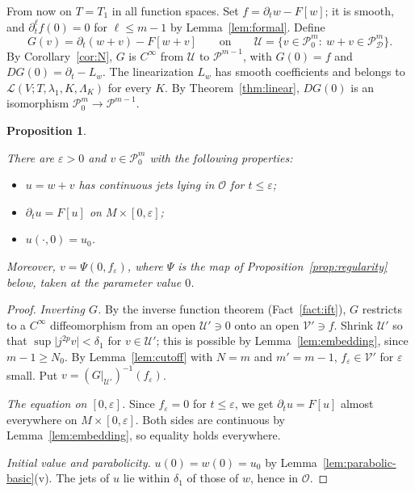 \documentclass[11pt,reqno]{amsart}
\newtheorem{proposition}[theorem]{Proposition}
\theoremstyle{definition}
\theoremstyle{remark}
\newcommand{\Pp}{\mathcal{P}}
\newcommand{\Dom}{\mathcal{D}}
\newcommand{\Par}{\mathcal{O}}
\newcommand{\Lcl}{\mathcal{L}}
\newcommand{\abs}[1]{\lvert #1\rvert}
\newcommand{\lean}[1]{}
\newcommand{\uses}[1]{}
\numberwithin{equation}{section}
\begin{document}
From now on $T=T_1$ in all function spaces. Set $f=\partial_tw-F[w]$; it is smooth, and
$\partial_t^\ell f(0)=0$ for $\ell\le m-1$ by Lemma~\ref{lem:formal}. Define
\[
  G(v)=\partial_t(w+v)-F[w+v]\qquad\text{on}\qquad\mathcal U=\{v\in\Pp^m_0:\ w+v\in\Pp^m_\Dom\}.
\]
By Corollary~\ref{cor:N}, $G$ is $C^\infty$ from $\mathcal U$ to $\Pp^{m-1}$, with $G(0)=f$ and
$DG(0)=\partial_t-L_w$. The linearization $L_w$ has smooth coefficients and belongs to
$\Lcl(V;T,\lambda_1,K,\Lambda_K)$ for every $K$. By Theorem~\ref{thm:linear}, $DG(0)$ is an
isomorphism $\Pp^m_0\to\Pp^{m-1}$.

\begin{proposition}\label{prop:existence}
\lean{ShortTime.EquationData.exists_parabolicSpace_solution, ShortTime.exists_injOn_and_image_mem_nhds, ShortTime.ParabolicSpace.timeDerivExt, ShortTime.ParabolicSpace.existenceMap, ShortTime.LinearOp.isomorphism_eq_heatExt, ShortTime.EquationData.exists_legendre_interval}
\uses{def:data, def:parabolic, def:legendre}
There are $\varepsilon>0$ and $v\in\Pp^m_0$ with the following properties:
\begin{itemize}[nosep]
\item $u=w+v$ has continuous jets lying in $\Par$ for $t\le\varepsilon$;
\item $\partial_tu=F[u]$ on $M\times[0,\varepsilon]$;
\item $u(\cdot,0)=u_0$.
\end{itemize}
Moreover, $v=\Psi(0,f_\varepsilon)$, where $\Psi$ is the map of Proposition~\ref{prop:regularity}
below, taken at the parameter value $0$.
\end{proposition}

\begin{proof}
\uses{lem:formal, lem:cutoff, cor:N, thm:linear, fact:ift, lem:embedding, lem:parabolic-basic, lem:legendre-basic}
\emph{Inverting $G$.} By the inverse function theorem (Fact~\ref{fact:ift}), $G$ restricts to a
$C^\infty$ diffeomorphism from an open $\mathcal U'\ni0$ onto an open $\mathcal V'\ni f$. Shrink
$\mathcal U'$ so that $\sup\abs{j^{2p}v}<\delta_1$ for $v\in\mathcal U'$; this is possible by
Lemma~\ref{lem:embedding}, since $m-1\ge N_0$. By Lemma~\ref{lem:cutoff} with $N=m$ and $m'=m-1$,
$f_\varepsilon\in\mathcal V'$ for $\varepsilon$ small. Put $v=(G|_{\mathcal U'})^{-1}(f_\varepsilon)$.

\emph{The equation on $[0,\varepsilon]$.} Since $f_\varepsilon=0$ for $t\le\varepsilon$, we get
$\partial_tu=F[u]$ almost everywhere on $M\times[0,\varepsilon]$. Both sides are continuous by
Lemma~\ref{lem:embedding}, so equality holds everywhere.

\emph{Initial value and parabolicity.} $u(0)=w(0)=u_0$ by Lemma~\ref{lem:parabolic-basic}(v). The jets
of $u$ lie within $\delta_1$ of those of $w$, hence in $\Par$.
\end{proof}
\end{document}
